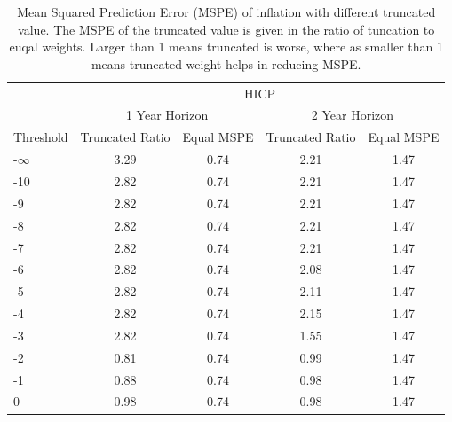 \documentclass[]{article}
\begin{document}
\begin{table}[!h]
\centering
\caption{Mean Squared Prediction Error (MSPE) of inflation with different truncated value. The MSPE of the truncated value is given in the ratio of tuncation to euqal weights. Larger than 1 means truncated is worse, where as smaller than 1 means truncated weight helps in reducing MSPE.}
\label{tab: MSPE HICP}
\begin{tabular}{lcccc}
\hline
          & \multicolumn{4}{c}{HICP}                                                \\
          \cmidrule{2-5}
          & \multicolumn{2}{c}{1 Year Horizon} & \multicolumn{2}{c}{2 Year Horizon} \\
          \cmidrule{2-3} \cmidrule{4-5}
Threshold & Truncated Ratio    & Equal MSPE    & Truncated Ratio    & Equal MSPE    \\
\cmidrule{1-1} \cmidrule{2-2} \cmidrule{3-3} \cmidrule{4-4} \cmidrule{5-5}
-$\infty$ & 3.29               & 0.74          & 2.21               & 1.47          \\
-10       & 2.82               & 0.74          & 2.21               & 1.47          \\
-9        & 2.82               & 0.74          & 2.21               & 1.47          \\
-8        & 2.82               & 0.74          & 2.21               & 1.47          \\
-7        & 2.82               & 0.74          & 2.21               & 1.47          \\
-6        & 2.82               & 0.74          & 2.08               & 1.47          \\
-5        & 2.82               & 0.74          & 2.11               & 1.47          \\
-4        & 2.82               & 0.74          & 2.15               & 1.47          \\
-3        & 2.82               & 0.74          & 1.55               & 1.47          \\
-2        & 0.81               & 0.74          & 0.99               & 1.47          \\
-1        & 0.88               & 0.74          & 0.98               & 1.47          \\
0         & 0.98               & 0.74          & 0.98               & 1.47          \\ 
\hline
\end{tabular}
\end{table}
\end{document}
